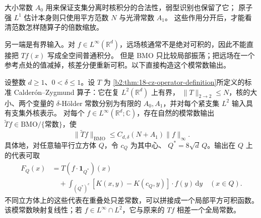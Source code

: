 大小常数 \(A_0\) 用来保证支集分离时核积分的合法性，弱型识别也保留了它；
原子强 \(L^1\) 估计本身则只使用平方范数 \(N\) 与光滑常数 \(A_1\)。
这些作用分开后，才能看清范数怎样随算子的倍数缩放。

\ProseParagraphBreak

另一端是有界输入。对 \(f\in L^\infty(\mathbb R^d)\)，远场核通常不是绝对可积的，因此不能直接把 \(Tf(x)\) 写成全空间普通积分。
但是 BMO 只比较局部振荡；把远场在一个参考点处的值减掉，核差分便重新可积。以下直接构造这个模常数输出。

\begin{proposition}
\label{b2:prop:C-linfty-bmo}
设整数 \(d\ge1\)、\(0<\delta\le1\)。设 \(T\) 为
\cref{b2:thm:18-cz-operator-definition}所定义的标准
Calderón--Zygmund 算子：它在复 \(L^2(\mathbb R^d)\) 上有界，
\(\|T\|_{2\to2}\le N\)，核的大小、两个变量的
\(\delta\)-Hölder 常数分别为有限的 \(A_0,A_1\)，并对每个紧支集
\(L^2\) 输入具有支集外核表示。
对每个 \(f\in L^\infty(\mathbb R^d;\mathbb C)\)，存在自然的模常数输出
\(\widetilde Tf\in\mathrm{BMO}/\{\text{常数}\}\)，使
\[
 \|\widetilde Tf\|_{\mathrm{BMO}}
 \le C_{d,\delta}(N+A_1)\|f\|_\infty.
\]
具体地，对任意轴平行立方体 \(Q\)，令 \(c_Q\) 为其中心、
\(Q^*=8\sqrt d\,Q\)。输出在 \(Q\) 上的代表可取
\[
\begin{aligned}
 F_Q(x)&=T(f\cdot\mathbf1_{Q^*})(x)\\
 &\quad+\int_{(Q^*)^c}[K(x,y)-K(c_Q,y)]\cdot f(y)\,\mathrm dy
 \quad(x\in Q).
\end{aligned}
\]
不同立方体上的这些代表在重叠处只差常数，可以拼接成一个局部平方可积函数。
该模常数映射复线性；若 \(f\in L^\infty\cap L^2\)，它与原来的
\(Tf\) 相差一个全局常数。
\end{proposition}
